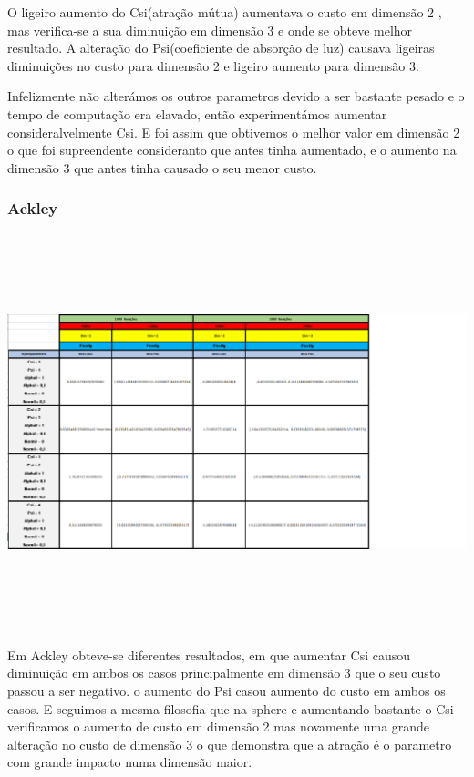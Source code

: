 \documentclass[10pt]{article}
\begin{document}
O ligeiro aumento do Csi(atração mútua) aumentava o custo em dimensão 2
, mas verifica-se a sua diminuição em dimensão 3 e onde se obteve melhor resultado. 
A alteração do Psi(coeficiente de absorção de luz) causava ligeiras diminuições
no custo para dimensão 2 e ligeiro aumento para dimensão 3.

Infelizmente não alterámos os outros parametros devido a ser bastante pesado
e o tempo de computação era elavado, então experimentámos aumentar
consideralvelmente Csi. E foi assim que obtivemos o melhor valor em dimensão
2 o que foi supreendente consideranto que antes tinha aumentado, e o aumento
na dimensão 3 que antes tinha causado o seu menor custo.


\subsubsection{Ackley}\label{sec:comp-PSO}
\begin{center}
  \includegraphics[height=11.5cm]{img/Fireflyackley.png}
\end{center}
Em Ackley obteve-se diferentes resultados, em que aumentar Csi
causou diminuição em ambos os casos principalmente em dimensão
3 que o seu custo passou a ser negativo. o aumento do Psi
casou aumento do custo em ambos os casos.
E seguimos a mesma filosofia que na sphere e aumentando bastante
o Csi verificamos o aumento de custo em dimensão 2 mas novamente uma
grande alteração no custo de dimensão 3 o que demonstra que a atração
é o parametro com grande impacto numa dimensão maior.
\end{document}
